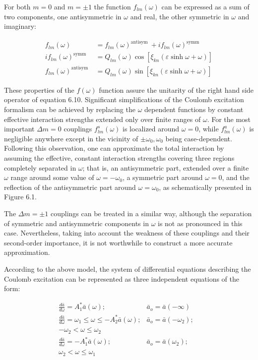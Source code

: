 \documentclass[10pt]{article}
\begin{document}
For both $m=0$ and $m= \pm 1$ the function $f_{l m}(\omega)$ can be expressed as a sum of two components, one antisymmetric in $\omega$ and real, the other symmetric in $\omega$ and imaginary:


\begin{align*}
f_{l m}(\omega) & =f_{l m}(\omega)^{\text {antisym }}+i f_{l m}(\omega)^{\text {symm }}  \tag{6.12}\\
i f_{l m}(\omega)^{\text {symm }} & =Q_{l m}(\omega) \cos \left[\xi_{k n}(\varepsilon \sinh \omega+\omega)\right] \\
f_{l m}(\omega)^{\text {antisym }} & =Q_{l m}(\omega) \sin \left[\xi_{k n}(\varepsilon \sinh \omega+\omega)\right]
\end{align*}


These properties of the $f(\omega)$ function assure the unitarity of the right hand side operator of equation 6.10. Significant simplifications of the Coulomb excitation formalism can be achieved by replacing the $\omega$ dependent functions by constant effective interaction strengths extended only over finite ranges of $\omega$. For the most important $\Delta m=0$ couplings $f_{l m}^{s}(\omega)$ is localized around $\omega=0$, while $f_{l m}^{a}(\omega)$ is negligible anywhere except in the vicinity of $\pm \omega_{0}, \omega_{0}$ being case-dependent. Following this observation, one can approximate the total interaction by assuming the effective, constant interaction strengths covering three regions completely separated in $\omega$; that is, an antisymmetric part, extended over a finite $\omega$ range around some value of $\omega=-\omega_{0}$, a symmetric part around $\omega=0$, and the reflection of the antisymmetric part around $\omega=\omega_{0}$, as schematically presented in Figure 6.1.

The $\Delta m= \pm 1$ couplings can be treated in a similar way, although the separation of symmetric and antisymmetric components in $\omega$ is not as pronounced in this case. Nevertheless, taking into account the weakness of these couplings and their second-order importance, it is not worthwhile to construct a more accurate approximation.

According to the above model, the system of differential equations describing the Coulomb excitation can be represented as three independent equations of the form:

\[
\begin{array}{lll}
\frac{d \bar{a}}{d \omega}=A_{1}^{*} \bar{a}(\omega) ; & \bar{a}_{o}=\bar{a}(-\infty) & \\
\frac{d \bar{a}}{d \omega}=\omega_{1} \leq \omega \leq-A_{2}^{*} \bar{a}(\omega) ; & \bar{a}_{o}=\bar{a}\left(-\omega_{2}\right) ; &  \tag{6.13}\\
-\omega_{2}<\omega \leq \omega_{2} \\
\frac{d \bar{a}}{d \omega}=-A_{1}^{*} \bar{a}(\omega) ; & \bar{a}_{o}=\bar{a}\left(\omega_{2}\right) ; & \\
\omega_{2}<\omega \leq \omega_{1}
\end{array}
\]
\end{document}
